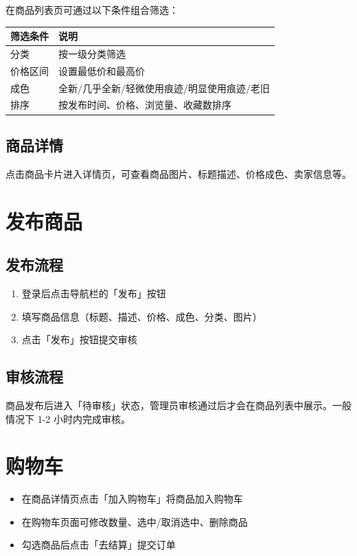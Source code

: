 \documentclass[12pt,a4paper,UTF8]{ctexart}
\begin{document}
在商品列表页可通过以下条件组合筛选：

\begin{table}[H]
\centering
\begin{tabularx}{\textwidth}{lX}
\toprule
\textbf{筛选条件} & \textbf{说明} \\
\midrule
分类 & 按一级分类筛选 \\
价格区间 & 设置最低价和最高价 \\
成色 & 全新/几乎全新/轻微使用痕迹/明显使用痕迹/老旧 \\
排序 & 按发布时间、价格、浏览量、收藏数排序 \\
\bottomrule
\end{tabularx}
\end{table}

\subsection{商品详情}

点击商品卡片进入详情页，可查看商品图片、标题描述、价格成色、卖家信息等。

\section{发布商品}

\subsection{发布流程}

\begin{enumerate}
    \item 登录后点击导航栏的「发布」按钮
    \item 填写商品信息（标题、描述、价格、成色、分类、图片）
    \item 点击「发布」按钮提交审核
\end{enumerate}

\subsection{审核流程}

商品发布后进入「待审核」状态，管理员审核通过后才会在商品列表中展示。一般情况下 1-2 小时内完成审核。

\section{购物车}

\begin{itemize}
    \item 在商品详情页点击「加入购物车」将商品加入购物车
    \item 在购物车页面可修改数量、选中/取消选中、删除商品
    \item 勾选商品后点击「去结算」提交订单
\end{itemize}
\end{document}
